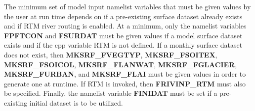 The minimum set of model input namelist variables that must be given
values by the user at run time depends on if a pre-existing surface
dataset already exists and if RTM river routing is enabled.  At a
minimum, only the namelist variables {\bf FPFTCON} and {\bf FSURDAT}
must be given values if a model surface dataset exists and if the cpp
variable RTM is not defined. If a monthly surface dataset does not
exist, then {\bf MKSRF\_FVEGTYP}, {\bf MKSRF\_FSOITEX}, {\bf
MKSRF\_FSOICOL}, {\bf MKSRF\_FLANWAT}, {\bf MKSRF\_FGLACIER}, {\bf
MKSRF\_FURBAN}, and {\bf MKSRF\_FLAI} must be given values in order to
generate one at runtime.  If RTM is invoked, then {\bf FRIVINP\_RTM}
must also be specified.  Finally, the namelist variable {\bf FINIDAT}
must be set if a pre-existing initial dataset is to be utilized.


